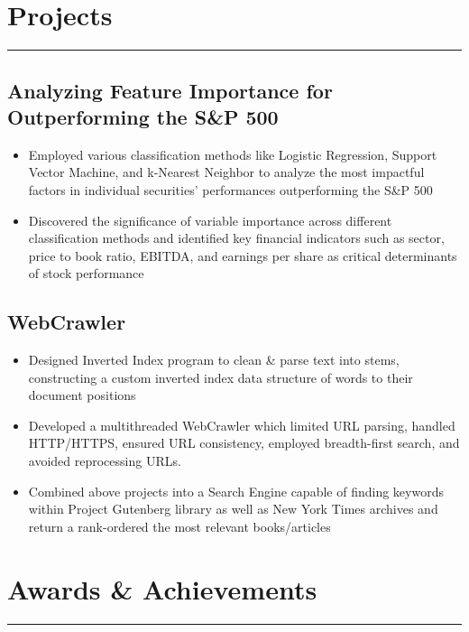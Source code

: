 \documentclass[11pt,a4paper]{article}
\newenvironment{myitemize}
{ \begin{itemize}[label={--}, leftmargin=*]
    \setlength{\itemsep}{0pt}
    \setlength{\parskip}{0pt}
    \setlength{\parsep}{0pt}     }
{ \end{itemize}                  }
\begin{document}
\section*{Projects}
\vspace{-3mm} %
\hrule
\vspace{3mm} %

\subsection*{Analyzing Feature Importance for Outperforming the S\&P 500 \hfill {} }

\begin{myitemize}
\item Employed various classification methods like Logistic Regression, Support Vector Machine, and k-Nearest Neighbor to analyze the most impactful factors in individual securities' performances outperforming the S\&P 500
\item Discovered the significance of variable importance across different classification methods and identified key financial indicators such as sector, price to book ratio, EBITDA, and earnings per share as critical determinants of stock performance
\end{myitemize}

\subsection*{WebCrawler \hfill {} }

\begin{myitemize}
\item Designed Inverted Index program to clean \& parse text into stems, constructing a custom inverted index data structure of words to their document positions
\item Developed a multithreaded WebCrawler which limited URL parsing, handled HTTP/HTTPS, ensured URL consistency, employed breadth-first search, and avoided reprocessing URLs. 
\item Combined above projects into a Search Engine capable of finding keywords within Project Gutenberg library as well as New York Times archives and return a rank-ordered the most relevant books/articles
\end{myitemize}


\section*{Awards \& Achievements}
\vspace{-3mm} %
\hrule
\vspace{3mm} %
\end{document}
